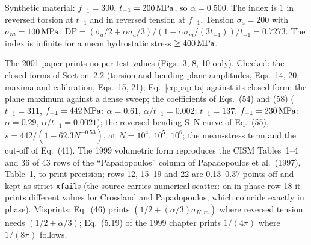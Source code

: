  Synthetic material: $f_{-1}=300$, $t_{-1}=200\,\mathrm{MPa}$, so $\alpha=0.500$. The index
is 1 in reversed torsion at $t_{-1}$ and in reversed tension at $f_{-1}$. Tension $\sigma_a=200$ with
$\sigma_m=100\,\mathrm{MPa}$:
$\mathrm{DP}=(\sigma_a/2+\alpha\sigma_a/3)/(1-\alpha\sigma_m/(3t_{-1}))/t_{-1}=0.7273$. The index is
infinite for a mean hydrostatic stress $\ge400\,\mathrm{MPa}$.

 The 2001 paper prints no per-test values (Figs.~3, 8, 10 only). Checked: the
closed forms of Section~2.2 (torsion and bending plane amplitudes, Eqs.~14, 20; maxima and
calibration, Eqs.~15, 21); Eq.~\eqref{eq:pap-ta} against its closed form; the plane maximum against a
dense sweep; the coefficients of Eqs.~(54) and (58) ($t_{-1}=311$, $f_{-1}=442\,\mathrm{MPa}$: $\alpha=0.61$,
$\alpha/t_{-1}=0.002$; $t_{-1}=137$, $f_{-1}=230\,\mathrm{MPa}$: $\alpha=0.29$, $\alpha/t_{-1}=0.0021$); the
reversed-bending S--N curve of Eq.~(55), $s=442/(1-62.3N^{-0.53})$, at $N=10^4$, $10^5$, $10^6$; the
mean-stress term and the cut-off of Eq.~(41). The 1999 volumetric form reproduces the CISM Tables~1--4
and 36 of 43 rows of the ``Papadopoulos'' column of Papadopoulos et al.\ (1997), Table~1, to print
precision; rows 12, 15--19 and 22 are 0.13--0.37 points off and kept as strict \texttt{xfail}s (the
source carries numerical scatter: on in-phase row 18 it prints different values for Crossland and
Papadopoulos, which coincide exactly in phase). Misprints: Eq.~(46) prints $(1/2+(\alpha/3)\sigma_{H,m})$ where reversed tension needs
$(1/2+\alpha/3)$; Eq.~(5.19) of the 1999 chapter prints $1/(4\pi)$ where $1/(8\pi)$ follows.
